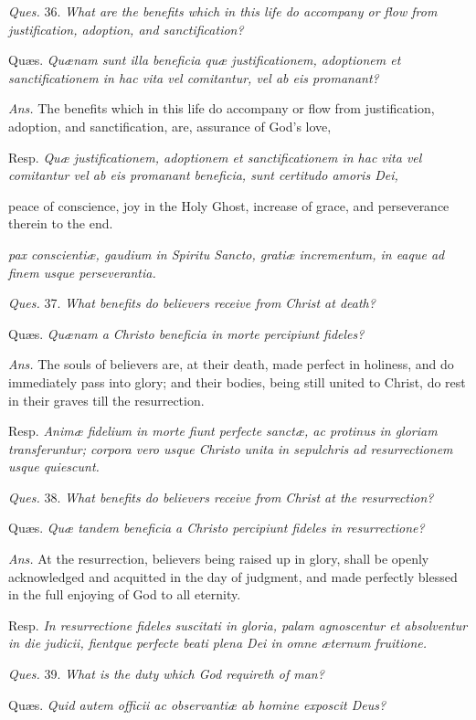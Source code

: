 \emph{Ques.} 36. \emph{What are the benefits which in this life do accompany or flow from justification, adoption, and sanctification?}

Quæs. \emph{Quænam sunt illa beneficia quæ justificationem, adoptionem et sanctificationem in hac vita vel comitantur, vel ab eis promanant?}

\emph{Ans.} The benefits which in this life do accompany or flow from justification, adoption, and sanctification, are, assurance of God's love,

Resp. \emph{Quæ justificationem, adoptionem et sanctificationem in hac vita vel comitantur vel ab eis promanant beneficia, sunt certitudo amoris Dei, }

peace of conscience, joy in the Holy Ghost, increase of grace, and perseverance therein to the end.

\emph{pax conscientiæ, gaudium in Spiritu Sancto, gratiæ incrementum, in eaque ad finem usque perseverantia.}

\emph{Ques.} 37. \emph{What benefits do believers receive from Christ at death?}

Quæs. \emph{Quænam a Christo beneficia in morte percipiunt fideles?}

\emph{Ans.} The souls of believers are, at their death, made perfect in holiness, and do immediately pass into glory; and their bodies, being still united to Christ, do rest in their graves till the resurrection.

Resp. \emph{Animæ fidelium in morte fiunt perfecte sanctæ, ac protinus in gloriam transferuntur; corpora vero usque Christo unita in sepulchris ad resurrectionem usque quiescunt.}

\emph{Ques.} 38. \emph{What benefits do believers receive from Christ at the resurrection?}

Quæs. \emph{Quæ tandem beneficia a Christo percipiunt fideles in resurrectione?}

\emph{Ans.} At the resurrection, believers being raised up in glory, shall be openly acknowledged and acquitted in the day of judgment, and made perfectly blessed in the full enjoying of God to all eternity.

Resp. \emph{In resurrectione fideles suscitati in gloria, palam agnoscentur et absolventur in die judicii, fientque perfecte beati plena Dei in omne æternum fruitione.}

\emph{Ques.} 39. \emph{What is the duty which God requireth of man?}

Quæs. \emph{Quid autem officii ac observantiæ ab homine exposcit Deus?}

